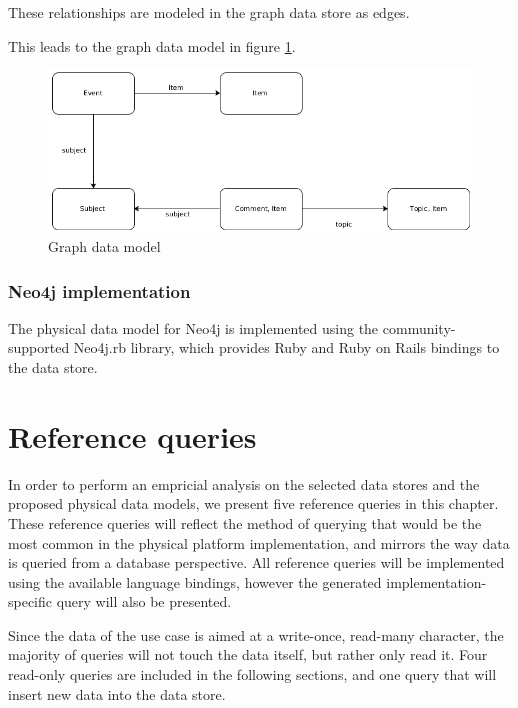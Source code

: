 These relationships are modeled in the graph data store as edges.

This leads to the graph data model in figure \ref{fig:graph-model}.

\begin{figure}
  \centering
  \includegraphics[width=.8\textwidth]{img/graph-model.png}
  \caption{Graph data model}
  \label{fig:graph-model}
\end{figure}

\subsubsection{Neo4j implementation}
\label{subsubsec:neo4j-implementation}

The physical data model for Neo4j is implemented using the community-supported Neo4j.rb library, which provides Ruby and Ruby on Rails bindings to the data store.

\section{Reference queries}
\label{sec:reference-queries}


In order to perform an empricial analysis on the selected data stores and the proposed physical data models, we present five reference queries in this chapter.
These reference queries will reflect the method of querying that would be the most common in the physical platform implementation, and mirrors the way data is queried from a database perspective.
All reference queries will be implemented using the available language bindings, however the generated implementation-specific query will also be presented.

Since the data of the use case is aimed at a write-once, read-many character, the majority of queries will not touch the data itself, but rather only read it.
Four read-only queries are included in the following sections, and one query that will insert new data into the data store.

